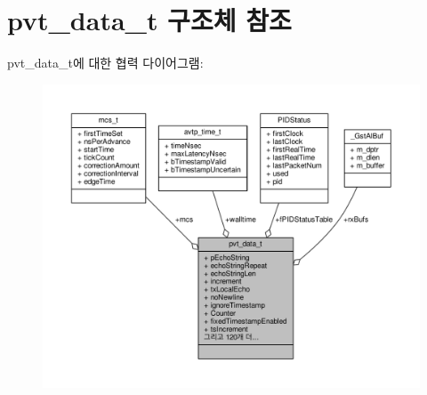 \hypertarget{structpvt__data__t}{}\section{pvt\+\_\+data\+\_\+t 구조체 참조}
\label{structpvt__data__t}


pvt\+\_\+data\+\_\+t에 대한 협력 다이어그램\+:
\nopagebreak
\begin{figure}[H]
\begin{center}
\leavevmode
\includegraphics[width=350pt]{structpvt__data__t__coll__graph}
\end{center}
\end{figure}
